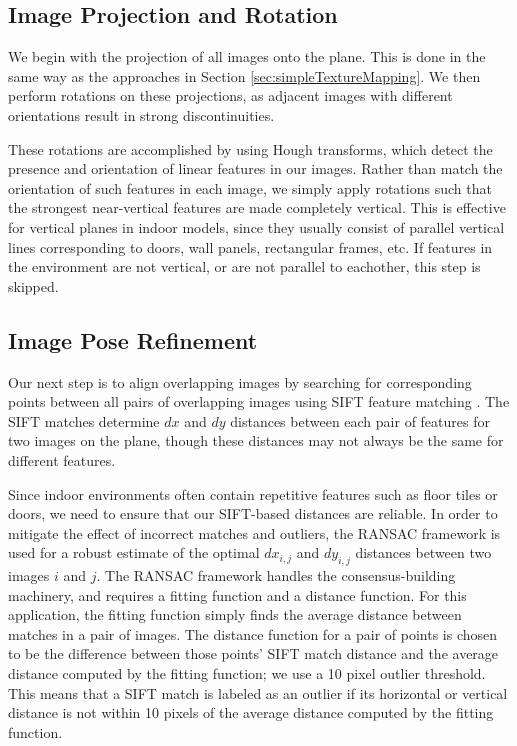 \documentclass[10pt,twocolumn,letterpaper]{article}
\begin{document}
\subsection{Image Projection and Rotation}
\label{sec:projectionAndRotation}
We begin with the projection of all images onto the plane. This is
done in the same way as the approaches in Section
\ref{sec:simpleTextureMapping}. We then perform rotations on these
projections, as adjacent images with different orientations result in
strong discontinuities.

These rotations are accomplished by using Hough transforms, which
detect the presence and orientation of linear features in our
images. Rather than match the orientation of such features in each
image, we simply apply rotations such that the strongest near-vertical
features are made completely vertical. This is effective for vertical
planes in indoor models, since they usually consist of parallel
vertical lines corresponding to doors, wall panels, rectangular
frames, etc. If features in the environment are not vertical, or are
not parallel to eachother, this step is skipped.


\subsection{Image Pose Refinement}
\label{sec:robustSIFTFeatureMatching}
Our next step is to align overlapping images by searching for
corresponding points between all pairs of overlapping images using
SIFT feature matching \cite{lowe1999object}. The SIFT matches
determine $dx$ and $dy$ distances between each pair of features for
two images on the plane, though these distances may not always be the
same for different features.

Since indoor environments often contain repetitive features such as
floor tiles or doors, we need to ensure that our SIFT-based distances
are reliable. In order to mitigate the effect of incorrect matches and
outliers, the RANSAC framework \cite{fischler1981random} is used for a
robust estimate of the optimal $dx_{i,j}$ and $dy_{i,j}$ distances between two
images $i$ and $j$. The RANSAC framework handles the consensus-building machinery,
and requires a fitting function and a distance function. For this
application, the fitting function simply finds the average distance
between matches in a pair of images. The distance function for a pair
of points is chosen to be the difference between those points' SIFT match distance
and the average distance computed by the fitting function; we use a 10
pixel outlier threshold. This means that a SIFT match is labeled as an
outlier if its horizontal or vertical distance is not within 10 pixels
of the average distance computed by the fitting function.
\end{document}
